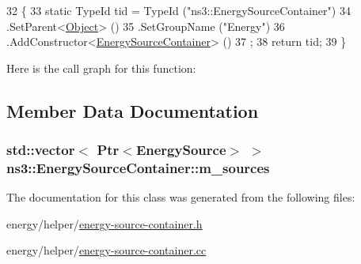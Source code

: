 \begin{DoxyCode}
32 \{
33   \textcolor{keyword}{static} TypeId tid = TypeId (\textcolor{stringliteral}{"ns3::EnergySourceContainer"})
34     .SetParent<\hyperlink{classns3_1_1Object_a40860402e64d8008fb42329df7097cdb}{Object}> ()
35     .SetGroupName (\textcolor{stringliteral}{"Energy"})
36     .AddConstructor<\hyperlink{classns3_1_1EnergySourceContainer_a3d96da242e1b8c5c24e6d42ae31e9193}{EnergySourceContainer}> ()
37   ;
38   \textcolor{keywordflow}{return} tid;
39 \}
\end{DoxyCode}


Here is the call graph for this function\+:




\subsection{Member Data Documentation}
\subsubsection[{\texorpdfstring{m\+\_\+sources}{m_sources}}]{\setlength{\rightskip}{0pt plus 5cm}std\+::vector$<$ {\bf Ptr}$<${\bf Energy\+Source}$>$ $>$ ns3\+::\+Energy\+Source\+Container\+::m\+\_\+sources\hspace{0.3cm}{\ttfamily [private]}}\hypertarget{classns3_1_1EnergySourceContainer_a83aaf672f6a5096463c819b0d8b3d98d}{}\label{classns3_1_1EnergySourceContainer_a83aaf672f6a5096463c819b0d8b3d98d}


The documentation for this class was generated from the following files\+:\begin{DoxyCompactItemize}
\item 
energy/helper/\hyperlink{energy-source-container_8h}{energy-\/source-\/container.\+h}\item 
energy/helper/\hyperlink{energy-source-container_8cc}{energy-\/source-\/container.\+cc}\end{DoxyCompactItemize}
